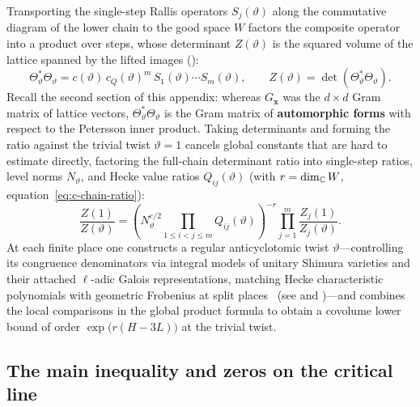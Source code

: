 Transporting the single-step Rallis operators $S_j(\vartheta)$ along the commutative diagram of the lower chain to the good space $W$ factors the composite operator into a product over steps, whose determinant $Z(\vartheta)$ is the squared volume of the lattice spanned by the lifted images ():
\[
\Theta_\vartheta^*\Theta_\vartheta
=c(\vartheta)\,c_Q(\vartheta)^m\,S_1(\vartheta)\cdots S_m(\vartheta),
\qquad
Z(\vartheta)=\det(\Theta_\vartheta^*\Theta_\vartheta).
\]
Recall the second section of this appendix: whereas $G_{\mathbf x}$ was the $d\times d$ Gram matrix of lattice vectors, $\Theta_\vartheta^*\Theta_\vartheta$ is the Gram matrix of \textbf{automorphic forms} with respect to the Petersson inner product. Taking determinants and forming the ratio against the trivial twist $\vartheta=1$ cancels global constants that are hard to estimate directly, factoring the full-chain determinant ratio into single-step ratios, level norms $N_\vartheta$, and Hecke value ratios $Q_{ij}(\vartheta)$ (with $r=\dim_{\mathbb{C}}W$, equation~\eqref{eq:c-chain-ratio}):
\[
\frac{Z(1)}{Z(\vartheta)}
=\left(N_\vartheta^{e/2}\prod_{1\le i<j\le m}Q_{ij}(\vartheta)\right)^{-r}
 \prod_{j=1}^{m}\frac{Z_j(1)}{Z_j(\vartheta)}.
\]
At each finite place one constructs a regular anticyclotomic twist $\vartheta$---controlling its congruence denominators via integral models of unitary Shimura varieties and their attached $\ell$-adic Galois representations, matching Hecke characteristic polynomials with geometric Frobenius at split places~\cite{Shin2011,ChenevierHarris2013,BLGGT2014} (see  and )---and combines the local comparisons in the global product formula to obtain a covolume lower bound of order $\exp\bigl(r(H-3L)\bigr)$ at the trivial twist.

\subsection{The main inequality and zeros on the critical line}

